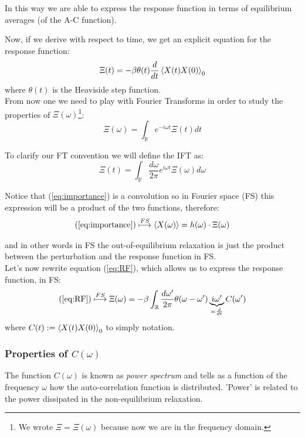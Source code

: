 \documentclass[\main/main.tex]{subfiles}
\begin{document}
In this way we are able to express the response function in terms of equilibrium averages (of the A-C function). 

Now, if we derive with respect to time, we get an explicit equation for the response function:
\begin{equation}
    \Xi(t)=-\beta \theta(t) \frac{d}{dt}\left\langle X(t)X(0) \right\rangle_0
    \label{eq:RF}
\end{equation}
where $\theta(t)$ is the Heaviside step function. \\

From now one we need to play with Fourier Transforms in order to study the properties of $\Xi(\omega)$\footnote{We wrote $\Xi=\Xi(\omega)$ because now we are in the frequency domain.}:
\begin{equation}
    \Xi(\omega)=\int_{\mathbb{R}} e^{-i\omega t}\Xi(t)dt
\end{equation}

To clarify our FT convention we will define the IFT as:
\begin{equation}
    \Xi(t)=\int_{\mathbb{R}}\frac{d\omega}{2\pi}e^{i\omega t}\Xi(\omega)d\omega
\end{equation}

Notice that (\ref{eq:importance}) is a convolution so in Fourier space (FS) this expression will be a product of the two functions, therefore:
\begin{align}
    (\ref{eq:importance}) \overset{FS}{\longmapsto} \left\langle X(\omega) \right\rangle=h(\omega)\cdot\Xi(\omega)
\end{align}

and in other words in FS the out-of-equilibrium relaxation is just the product between the perturbation and the response function in FS. \\

Let's now rewrite equation (\ref{eq:RF}), which allows us to express the response function, in FS:
\begin{equation}
   (\ref{eq:RF}) \overset{FS}{\longmapsto} \Xi(\omega)=-\beta\int_{\mathbb{R}}\frac{d\omega'}{2\pi}\theta(\omega-\omega')\underbrace{i\omega'}_{=\frac{d}{dt}}C(\omega')
   \label{eq:response_c}
\end{equation}
where $C(t):=\left\langle X(t)X(0) \right\rangle_0$ to simply notation.

\subsubsection{Properties of $C(\omega)$}
The function $C(\omega)$ is known as \textit{power spectrum} and tells as a function of the frequency $\omega$ how the auto-correlation function is distributed. 'Power' is related to the power dissipated in the non-equilibrium relaxation.
\end{document}
